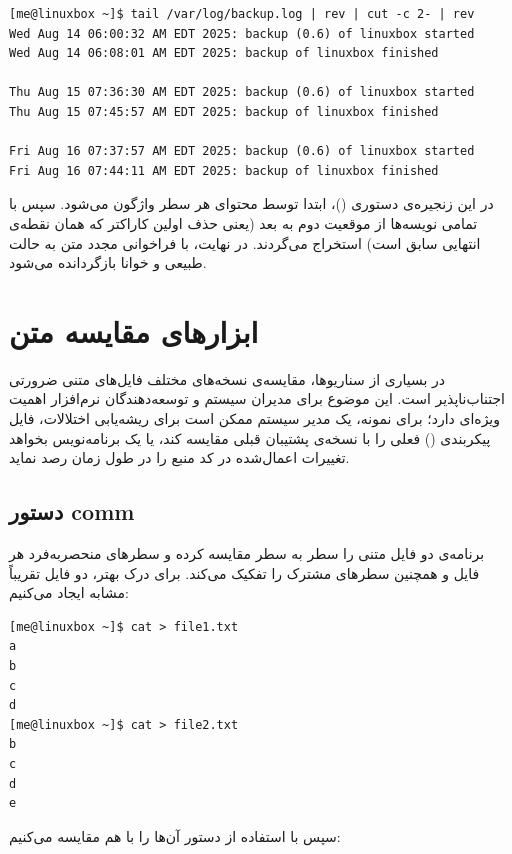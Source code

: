 \begin{latin}
\begin{lstlisting}
[me@linuxbox ~]$ tail /var/log/backup.log | rev | cut -c 2- | rev
Wed Aug 14 06:00:32 AM EDT 2025: backup (0.6) of linuxbox started
Wed Aug 14 06:08:01 AM EDT 2025: backup of linuxbox finished

Thu Aug 15 07:36:30 AM EDT 2025: backup (0.6) of linuxbox started
Thu Aug 15 07:45:57 AM EDT 2025: backup of linuxbox finished

Fri Aug 16 07:37:57 AM EDT 2025: backup (0.6) of linuxbox started
Fri Aug 16 07:44:11 AM EDT 2025: backup of linuxbox finished
\end{lstlisting}
\end{latin}

در این زنجیره‌ی دستوری ()، ابتدا توسط  محتوای هر سطر واژگون می‌شود. سپس با  تمامی نویسه‌ها از موقعیت دوم به بعد (یعنی حذف اولین کاراکتر که همان نقطه‌ی انتهایی سابق است) استخراج می‌گردند. در نهایت، با فراخوانی مجدد  متن به حالت طبیعی و خوانا بازگردانده می‌شود.

\section{ابزارهای مقایسه متن}

در بسیاری از سناریوها، مقایسه‌ی نسخه‌های مختلف فایل‌های متنی ضرورتی اجتناب‌ناپذیر است. این موضوع برای مدیران سیستم و توسعه‌دهندگان نرم‌افزار اهمیت ویژه‌ای دارد؛ برای نمونه، یک مدیر سیستم ممکن است برای ریشه‌یابی اختلالات، فایل پیکربندی () فعلی را با نسخه‌ی پشتیبان قبلی مقایسه کند، یا یک برنامه‌نویس بخواهد تغییرات اعمال‌شده در کد منبع را در طول زمان رصد نماید.

\subsection{دستور comm}

برنامه‌ی  دو فایل متنی را سطر به سطر مقایسه کرده و سطرهای منحصربه‌فرد هر فایل و همچنین سطرهای مشترک را تفکیک می‌کند. برای درک بهتر، دو فایل تقریباً مشابه ایجاد می‌کنیم:

\begin{latin}
\begin{lstlisting}
[me@linuxbox ~]$ cat > file1.txt
a
b
c
d
[me@linuxbox ~]$ cat > file2.txt
b
c
d
e
\end{lstlisting}
\end{latin}

سپس با استفاده از دستور  آن‌ها را با هم مقایسه می‌کنیم:


